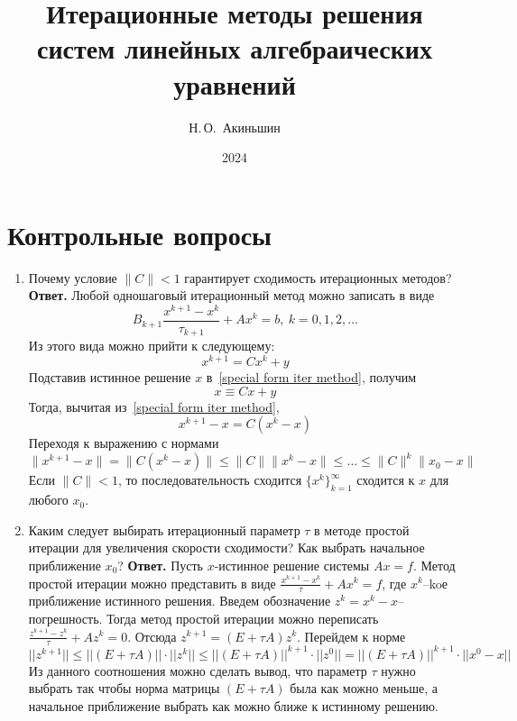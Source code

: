 \documentclass{article}
\title{Итерационные методы решения систем
линейных алгебраических уравнений}
\author{Н.\,О.~Акиньшин}
\date{2024}
\begin{document}
    \maketitle
    \newpage
    \tableofcontents
    \newpage

    \section{Контрольные вопросы}
    \begin{enumerate}
        \item Почему условие $\|C\| < 1$ гарантирует сходимость итерационных методов?
        \newline
        {\bfseries Ответ.}
        Любой одношаговый итерационный метод можно записать в виде 
        \begin{equation*}
            B_{k+1}\frac{x^{k+1} - x^k}{\tau_{k+1}} + A x^k = b, \ k = 0, 1, 2,\ldots
        \end{equation*}
        Из этого вида можно прийти к следующему:
        \begin{equation}
            x^{k+1} = Cx^k + y
            \label{special form iter method}
        \end{equation}
        Подставив истинное решение $x$ в~\eqref{special form iter method},
        получим 
        \begin{equation*}
            x \equiv  Cx + y 
        \end{equation*}
        Тогда, вычитая из~\eqref{special form iter method},
        \begin{equation*}
            x^{k+1} - x = C(x^{k} - x)
        \end{equation*}
        Переходя к выражению с нормами
        \begin{equation*}
            \|x^{k+1} - x\| = \|C(x^{k} - x)\| \leqslant
           \|C\| \|x^{k} - x\| \leqslant \ldots \leqslant \|C\|^{k}\|x_0 - x\|
        \end{equation*}
        Если $\|C\| < 1$, то последовательность сходится $\{x^k\}_{k=1}^\infty$ сходится к $x$ для 
        любого $x_0$.

        
        \item Каким следует выбирать итерационный параметр $\tau$ в методе 
        простой итерации для увеличения скорости сходимости?
        Как выбрать начальное приближение $x_0$?
        \newline
        {\bfseries Ответ.}
        Пусть $x$-истинное решение системы $Ax=f$. Метод простой итерации можно представить в виде $\frac{x^{k+1}-x^k}{\tau}+Ax^k=f$, где $x^k$--koе приближение истинного решения. Введем обозначение $z^k=x^k-x$--погрешность. Тогда метод простой итерации можно переписать $\frac{z^{k+1}-z^k}{\tau}+Az^k=0$. Отсюда $z^{k+1}=(E + \tau A) z^k$. Перейдем к норме
	\[
	||z^{k+1}||\le||(E + \tau A)|| \cdot ||z^k||\le ||(E + \tau A)||^{k+1} \cdot ||z^0|| =||(E + \tau A)||^{k+1} \cdot ||x^0-x||
	\]
	Из данного соотношения можно сделать вывод, что параметр $\tau$ нужно выбрать так чтобы норма матрицы $(E+\tau A)$ была как можно меньше, а начальное приближение выбрать как можно ближе к истинному решению.


\end{enumerate}
\end{document}
